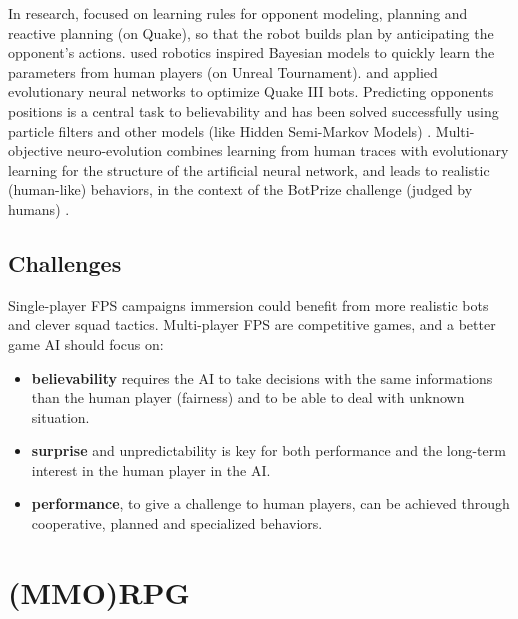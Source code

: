 In research, \citet{Laird01} focused on learning rules for opponent modeling, planning and reactive planning (on Quake), so that the robot builds plan by anticipating the opponent's actions. \citet{LeHy04,theseRonan} used robotics inspired Bayesian models to quickly learn the parameters from human players (on Unreal Tournament). \citet{Zanetti2004} and \citet{westraQ3} applied evolutionary neural networks to optimize Quake III bots. Predicting opponents positions is a central task to believability and has been solved successfully using particle filters \citep{particlefiltergameAI} and other models (like Hidden Semi-Markov Models) \citep{Hladky_anevaluation}. Multi-objective neuro-evolution \citep{Zanetti2004,schrum_cig11competition} combines learning from human traces with evolutionary learning for the structure of the artificial neural network, and leads to realistic (human-like) behaviors, in the context of the BotPrize challenge (judged by humans) \citep{Hingston_2009}.

\subsection{Challenges}

Single-player FPS campaigns immersion could benefit from more realistic bots and clever squad tactics. Multi-player FPS are competitive games, and a better game AI should focus on:
\begin{itemize}
    \item \textbf{believability} requires the AI to take decisions with the same informations than the human player (fairness) and to be able to deal with unknown situation.
    \item \textbf{surprise} and {unpredictability} is key for both performance and the long-term interest in the human player in the AI.
    \item \textbf{performance}, to give a challenge to human players, can be achieved through cooperative, planned and specialized behaviors.
\end{itemize}


\section{(MMO)RPG}

\label{sec:MMORPG}

